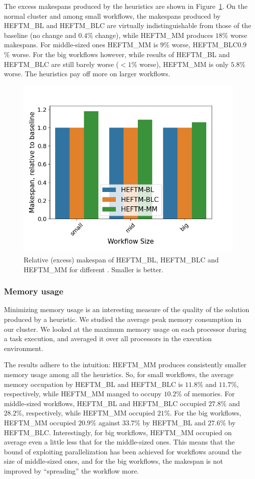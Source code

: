 \documentclass[conference]{IEEEtran}
\newcommand{\algo}[1]{\textsc{#1}}
\newcommand{\heftmm}{\algo{HEFTM\_MM}\xspace}
\newcommand{\heftbl}{\algo{HEFTM\_BL}\xspace}
\newcommand{\heftblc}{\algo{HEFTM\_BLC}\xspace}
\begin{document}
    The excess makespans produced by the heuristics are shown in Figure~\ref{fig:excess-ms}.
    On the normal cluster and among small workflows, the makespans produced by \heftbl and \heftblc are virtually indistinguishable
    from those of the baseline (no change and $0.4$\% change), while \heftmm produces  $18$\% worse makespans.
    For middle-sized ones \heftmm is $9$\% worse,  \heftblc $0.9$\% worse.
    For the big workflows however, while results of \heftbl and \heftblc are still barely worse ($<1$\% worse),
     \heftmm is only $5.8$\% worse.
    The heuristics pay off more on larger workflows.

    \begin{figure}[tb]
        \centering
        \includegraphics[width=0.495\columnwidth] {images/ms-relative-3groups}
        \caption{Relative (excess) makespan of \heftbl, \heftblc and \heftmm for different . Smaller is better.}
       \label{fig:excess-ms}
        \vspace{-0.3cm}
    \end{figure}
    \subsubsection{Memory usage}
    Minimizing memory usage is an interesting measure of the quality of the solution produced by a heuristic.
    We studied the average peak memory consumption in our cluster.
    We looked at the maximum memory usage on each processor during a task execution, and averaged it over all processors
    in the execution environment.

    The results adhere to the intuition: \heftmm produces consistently smaller memory usage among all the heuristics.
    So, for small workflows, the average memory occupation by \heftbl and \heftblc is $11.8$\% and $11.7$\%, respectively,
    while \heftmm manged to occupy $10.2$\% of memories.
    For middle-sized workflows, \heftbl and \heftblc occupied $27.8$\% and $28.2$\%, respectively, while \heftmm occupied
    $21$\%.
    For the big workflows, \heftmm occupied $20.9$\% against $33.7$\% by \heftbl and $27.6$\% by \heftblc.
    Interestingly, for big workflows, \heftmm occupied on average even a little less that for the middle-sized ones.
    This means that the bound of exploiting parallelization has been achieved for workflows around the size of middle-sized ones,
    and for the big workflows, the makespan is not improved by ``spreading'' the workflow more.
\end{document}
